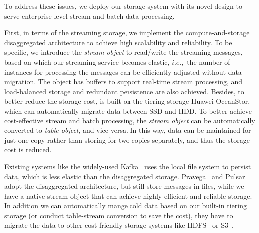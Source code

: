 


To address these issues, we deploy our \sys storage system with its novel design to serve enterprise-level  stream and batch data processing.


First, in terms of the streaming storage, we implement the compute-and-storage disaggregated architecture to achieve high scalability and reliability. To be specific, 
 we introduce the \textit{stream object}  to read/write the streaming messages, based on which our streaming service becomes elastic, $i.e.,$ the number of instances for processing the messages can be efficiently adjusted without data migration. The object has buffers to support real-time stream processing, and load-balanced storage and redundant persistence are also achieved. 
Besides, to better reduce the storage cost,  \sys is built on the tiering storage Huawei OceanStor, which can automatically migrate data between SSD and HDD.
To better achieve cost-effective stream and batch processing, the \textit{stream object}  can be automatically converted  to  \textit{table object}, and vice versa. In this way, data can be maintained for just one copy rather than storing for two copies separately, and thus the storage cost is reduced. 


Existing systems like the widely-used Kafka~\cite{kafka} uses the local file system to persist data, which is less elastic than the disaggregated storage.  Pravega~\cite{pravega} and Pulsar~\cite{pulsa} adopt the disaggregated architecture, but still  store messages in files, while we have a native stream object that can achieve highly efficient and reliable storage.
In addition we can automatically mange cold data based on our built-in tiering storage (or conduct table-stream conversion to save the cost), they have to migrate the data to other cost-friendly storage systems like  HDFS~\cite{hdfs} or S3~\cite{s3}.



